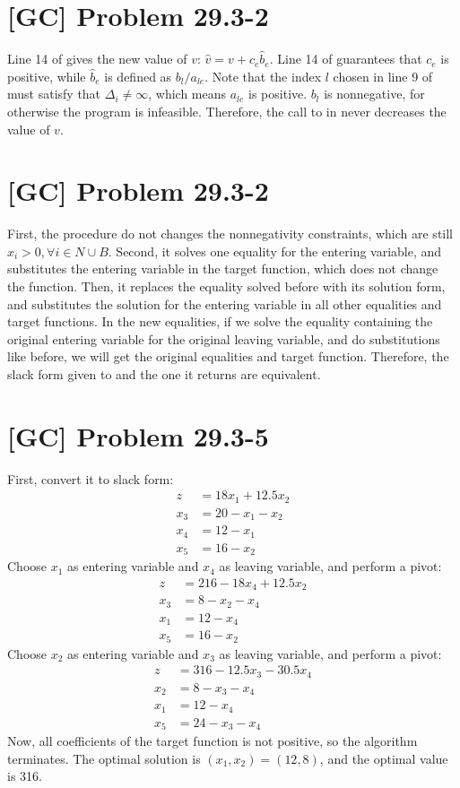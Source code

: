 \documentclass[a4paper,11pt,twocolumn]{article}
\begin{document}
  \section{[GC] Problem 29.3-2}
  Line 14 of  gives the new value of $v$: $\hat{v} = v + c_e \hat{b}_e$. Line 14 of  guarantees that $c_e$ is positive, while $\hat{b}_e$ is defined as $b_l / a_{le}$. Note that the index $l$ chosen in line 9 of  must satisfy that $\Delta_{i} \neq \infty$, which means $a_{le}$ is positive. $b_l$ is nonnegative, for otherwise the program is infeasible. Therefore, the call to  in  never decreases the value of $v$.

  \section{[GC] Problem 29.3-2}
  First, the procedure  do not changes the nonnegativity constraints, which are still $x_i > 0, \forall i \in N \cup B$. Second, it solves one equality for the entering variable, and substitutes the entering variable in the target function, which does not change the function. Then, it replaces the equality solved before with its solution form, and substitutes the solution for the entering variable in all other equalities and target functions. In the new equalities, if we solve the equality containing the original entering variable for the original leaving variable, and do substitutions like before, we will get the original equalities and target function. Therefore, the slack form given to  and the one it returns are equivalent.

  \section{[GC] Problem 29.3-5}
  First, convert it to slack form:
  \begin{align*}
    z &= 18x_1 + 12.5x_2 \\
    x_3 &= 20 - x_1 - x_2 \\
    x_4 &= 12 - x_1 \\
    x_5 &= 16 - x_2
  \end{align*}
  Choose $x_1$ as entering variable and $x_4$ as leaving variable, and perform a pivot:
  \begin{align*}
    z &= 216 - 18x_4 + 12.5x_2 \\
    x_3 &= 8 - x_2 - x_4 \\
    x_1 &= 12 - x_4 \\
    x_5 &= 16 - x_2
  \end{align*}
  Choose $x_2$ as entering variable and $x_3$ as leaving variable, and perform a pivot:
  \begin{align*}
    z &= 316 - 12.5x_3 - 30.5x_4 \\
    x_2 &= 8 - x_3 - x_4 \\
    x_1 &= 12 - x_4 \\
    x_5 &= 24 - x_3 - x_4
  \end{align*}
  Now, all coefficients of the target function is not positive, so the algorithm terminates. The optimal solution is $(x_1, x_2) = (12, 8)$, and the optimal value is 316.
\end{document}
